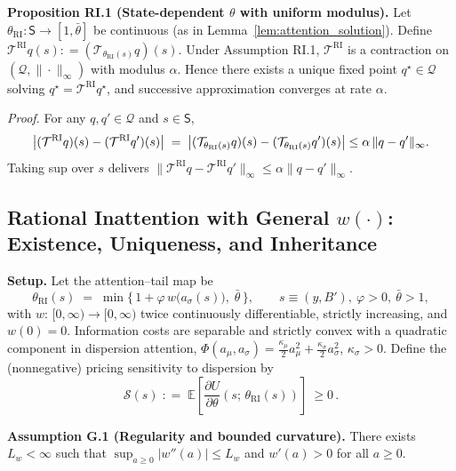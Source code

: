 \documentclass[12pt]{article}
\providecommand{\coloneqq}{\mathrel{\mathop:}=}
\theoremstyle{plain}
\newcommand{\E}{\mathbb{E}}
\begin{document}
\noindent\textbf{Proposition RI.1 (State-dependent $\theta$ with uniform modulus).} Let $\theta_{\mathrm{RI}}: \mathsf S\to[1,\bar\theta]$ be continuous (as in Lemma~\ref{lem:attention_solution}). Define $\mathcal T^{\mathrm{RI}} q (s) \coloneqq (\mathcal T_{\theta_{\mathrm{RI}}(s)} q)(s)$. Under Assumption RI.1, $\mathcal T^{\mathrm{RI}}$ is a contraction on $(\mathcal Q, \|\cdot\|_\infty)$ with modulus $\alpha$. Hence there exists a unique fixed point $q^\star \in \mathcal Q$ solving $q^\star = \mathcal T^{\mathrm{RI}} q^\star$, and successive approximation converges at rate $\alpha$.

\noindent\textit{Proof.} For any $q,q' \in \mathcal Q$ and $s \in \mathsf S$,
\[ \big| (\mathcal T^{\mathrm{RI}} q)(s) - (\mathcal T^{\mathrm{RI}} q')(s) \big| \;=\; \big| (\mathcal T_{\theta_{\mathrm{RI}}(s)} q)(s) - (\mathcal T_{\theta_{\mathrm{RI}}(s)} q')(s) \big| \\
	\le \alpha \, \| q-q' \|_\infty. \]
Taking sup over $s$ delivers $\| \mathcal T^{\mathrm{RI}} q - \mathcal
	T^{\mathrm{RI}} q' \|_\infty \le \alpha \| q-q' \|_\infty$.

\subsection{Rational Inattention with General \texorpdfstring{$w(\cdot)$}{w(·)}: Existence, Uniqueness, and Inheritance}\label{app:ri_general}

\textbf{Setup.} Let the attention--tail map be
\begin{equation}\label{eq:theta_RI_general}
	\theta_{\mathrm{RI}}(s)\;=\;\min\Big\{\,1+\varphi\, w\big(a_\sigma(s)\big),\;\bar\theta\,\Big\},\qquad s\equiv(y,B'),\ \varphi>0,\ \bar\theta>1,
\end{equation}
with $w:\,[0,\infty)\to[0,\infty)$ twice continuously differentiable, strictly increasing, and $w(0)=0$.
Information costs are separable and strictly convex with a quadratic component in dispersion attention,
\(\Phi(a_\mu,a_\sigma)=\tfrac{\kappa_\mu}{2}a_\mu^2+\tfrac{\kappa_\sigma}{2}a_\sigma^2\), $\kappa_\sigma>0$.
Define the (nonnegative) pricing sensitivity to dispersion by
\begin{equation}\label{eq:S_bound_def}
	\mathcal S(s)\;\coloneqq\;\E\!\left[\frac{\partial U}{\partial\theta}(s;\,\theta_{\mathrm{RI}}(s))\right] \ \ge 0\,.
\end{equation}

\noindent\textbf{Assumption G.1 (Regularity and bounded curvature).} There exists $L_w<\infty$ such that $\sup_{a\ge 0}|w''(a)|\le L_w$ and $w'(a)>0$ for all $a\ge 0$.
\end{document}
